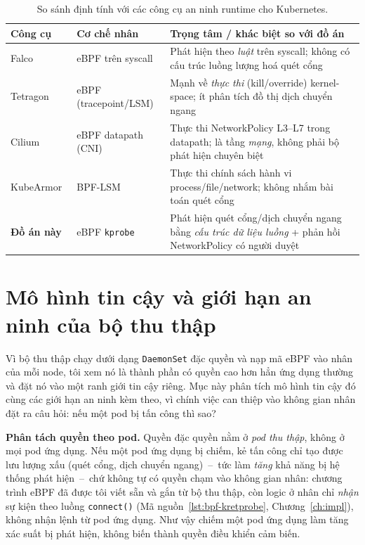 \begin{table}[H]
  \centering
  \caption{So sánh định tính với các công cụ an ninh runtime cho Kubernetes.}
  \label{tab:eval-related}
  \small
  \begin{tabularx}{\linewidth}{@{}l l X@{}}
    \toprule
    \textbf{Công cụ} & \textbf{Cơ chế nhân} & \textbf{Trọng tâm / khác biệt so với đồ án} \\
    \midrule
    Falco~\cite{falco2024}        & eBPF trên syscall   & Phát hiện theo \emph{luật} trên syscall; không có cấu trúc luồng lượng hoá quét cổng \\
    Tetragon~\cite{tetragon2024}  & eBPF (tracepoint/LSM) & Mạnh về \emph{thực thi} (kill/override) kernel-space; ít phân tích đồ thị dịch chuyển ngang \\
    Cilium~\cite{cilium2024}      & eBPF datapath (CNI) & Thực thi NetworkPolicy L3--L7 trong datapath; là tầng \emph{mạng}, không phải bộ phát hiện chuyên biệt \\
    KubeArmor~\cite{kubearmor2024}& BPF-LSM             & Thực thi chính sách hành vi process/file/network; không nhắm bài toán quét cổng \\
    \textbf{Đồ án này}            & eBPF \texttt{kprobe} & Phát hiện quét cổng/dịch chuyển ngang bằng \emph{cấu trúc dữ liệu luồng} + phản hồi NetworkPolicy có người duyệt \\
    \bottomrule
  \end{tabularx}
\end{table}

\section{Mô hình tin cậy và giới hạn an ninh của bộ thu thập}
\label{sec:eval-trust}

Vì bộ thu thập chạy dưới dạng \texttt{DaemonSet} đặc quyền và nạp mã eBPF vào nhân của
mỗi node, tôi xem nó là thành phần có quyền cao hơn hẳn ứng dụng thường và đặt nó vào
một ranh giới tin cậy riêng. Mục này phân tích mô hình tin cậy đó cùng các giới hạn an
ninh kèm theo, vì chính việc can thiệp vào không gian nhân đặt ra câu hỏi: nếu một pod
bị tấn công thì sao?

\textbf{Phân tách quyền theo pod.} Quyền đặc quyền nằm ở \emph{pod thu thập}, không ở
mọi pod ứng dụng. Nếu một pod ứng dụng bị chiếm, kẻ tấn công chỉ tạo được lưu lượng xấu
(quét cổng, dịch chuyển ngang)~--~tức làm \emph{tăng} khả năng bị hệ thống phát
hiện~--~chứ không tự có quyền chạm vào không gian nhân: chương trình eBPF đã được tôi
viết sẵn và gắn từ bộ thu thập, còn logic ở nhân chỉ \emph{nhận} sự kiện theo luồng
\texttt{connect()} (Mã nguồn~\ref{lst:bpf-kretprobe}, Chương~\ref{ch:impl}), không nhận
lệnh từ pod ứng dụng. Như vậy chiếm một pod ứng dụng làm tăng xác suất bị phát hiện,
không biến thành quyền điều khiển cảm biến.

